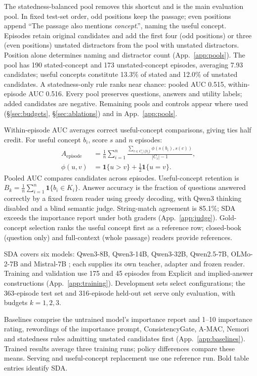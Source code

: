 The statedness-balanced pool removes this shortcut and is the main evaluation pool. In fixed test-set order, odd positions keep the passage; even positions append ``The passage also mentions \emph{concept}.'', naming the useful concept. Episodes retain original candidates and add the first four (odd positions) or three (even positions) unstated distractors from the pool with unstated distractors. Position alone determines naming and distractor count (App.~\ref{app:pools}). The pool has 190 stated-concept and 173 unstated-concept episodes, averaging 7.93 candidates; useful concepts constitute 13.3\% of stated and 12.0\% of unstated candidates. A statedness-only rule ranks near chance: pooled AUC 0.515, within-episode AUC 0.516. Every pool preserves questions, answers and utility labels; added candidates are negative. Remaining pools and controls appear where used (\S\ref{sec:budgets}, \S\ref{sec:ablations}) and in App.~\ref{app:pools}.

Within-episode AUC averages correct useful-concept comparisons, giving ties half credit. For useful concept $b_i$, score $s$ and $n$ episodes:
\begin{equation}
\begin{split}
A_{\mathrm{episode}}&=\frac{1}{n}\sum_{i=1}^{n}\frac{\sum_{c\in C_i\setminus\{b_i\}}\phi(s(b_i),s(c))}{|C_i|-1},\\
\phi(u,v)&=\mathbf{1}\{u>v\}+\tfrac12\mathbf{1}\{u=v\}.
\end{split}
\label{eq:episodeauc}
\end{equation}
Pooled AUC compares candidates across episodes. Useful-concept retention is $B_k=\frac{1}{n}\sum_{i=1}^{n}\mathbf{1}\{b_i\in K_i\}$. Answer accuracy is the fraction of questions answered correctly by a fixed frozen reader using greedy decoding, with Qwen3 thinking disabled and a blind semantic judge. String-match agreement is 85.1\%; SDA exceeds the importance report under both graders (App.~\ref{app:judge}). Gold-concept selection ranks the useful concept first as a reference row; closed-book (question only) and full-context (whole passage) readers provide references.

SDA covers six models: Qwen3-8B, Qwen3-14B, Qwen3-32B, Qwen2.5-7B, OLMo-2-7B and Mistral-7B \citep{qwen2025,olmo2,jiang2023mistral,qwen3}; each supplies its own teacher, adapter and frozen reader. Training and validation use 175 and 45 episodes from Explicit and implied-answer constructions (App.~\ref{app:training}). Development sets select configurations; the 363-episode test set and 316-episode held-out set serve only evaluation, with budgets $k=1,2,3$.

Baselines comprise the untrained model's importance report and 1--10 importance rating, rewordings of the importance prompt, ConsistencyGate, A-MAC, Nemori and statedness rules admitting unstated candidates first (App.~\ref{app:baselines}). Trained results average three training runs; policy differences compare these means. Serving and useful-concept replacement use one reference run. Bold table entries identify SDA.
